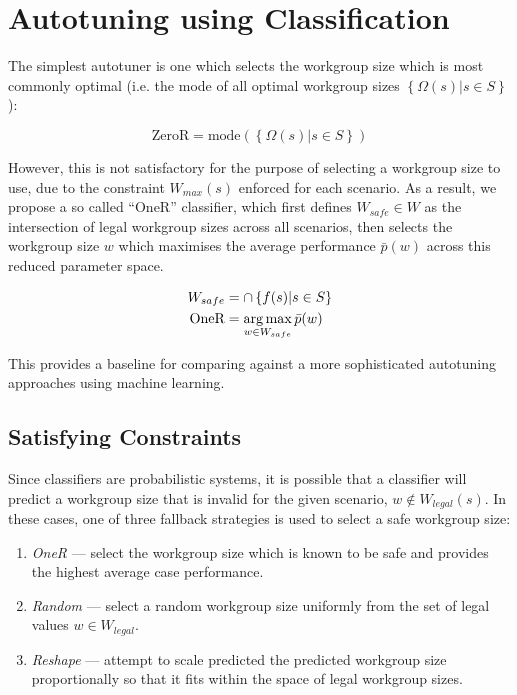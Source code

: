 \section{Autotuning using Classification}

The simplest autotuner is one which selects the workgroup size which
is most commonly optimal (i.e. the mode of all optimal workgroup sizes
$\left\{ \Omega(s) | s \in S \right\}$):

\begin{equation}
\text{ZeroR} = \text{mode}( \left\{ \Omega(s) | s \in S \right\} )
\end{equation}

However, this is not satisfactory for the purpose of selecting a
workgroup size to use, due to the constraint $W_{max}(s)$ enforced for
each scenario. As a result, we propose a so called ``OneR''
classifier, which first defines $W_{safe} \in W$ as the intersection
of legal workgroup sizes across all scenarios, then selects the
workgroup size $w$ which maximises the average performance
$\bar{p}(w)$ across this reduced parameter space.

\begin{align}
W_{safe} &= \cap \left\{ f(s) | s \in S \right\} \\
\text{OneR} &= \operatorname*{arg\,max}_{w \in W_{safe}} \bar{p}(w)
\end{align}

This provides a baseline for comparing against a more sophisticated
autotuning approaches using machine learning.

\subsection{Satisfying Constraints}

Since classifiers are probabilistic systems, it is possible that a
classifier will predict a workgroup size that is invalid for the given
scenario, $w \not\in W_{legal}(s)$. In these cases, one of three
fallback strategies is used to select a safe workgroup size:

\begin{enumerate}
\item \emph{OneR} --- select the workgroup size which is known to be
  safe and provides the highest average case performance.
\item \emph{Random} --- select a random workgroup size uniformly from
  the set of legal values $w \in W_{legal}$.
\item \emph{Reshape} --- attempt to scale predicted the predicted
  workgroup size proportionally so that it fits within the space of
  legal workgroup sizes.
\end{enumerate}

